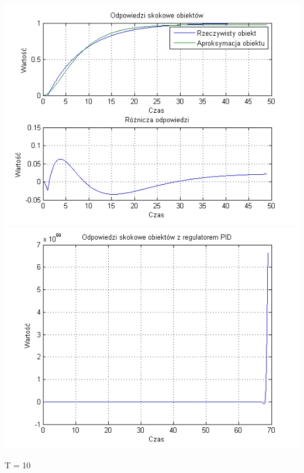\documentclass[10pt,a4paper]{article}
\begin{document}
\begin{center}
\includegraphics[scale=1]{images/dwa/skrypt_27.png}\\
\includegraphics[scale=1]{images/dwa/skrypt_28.png}\\
\end{center}
\newpage
T = 10
\end{document}

